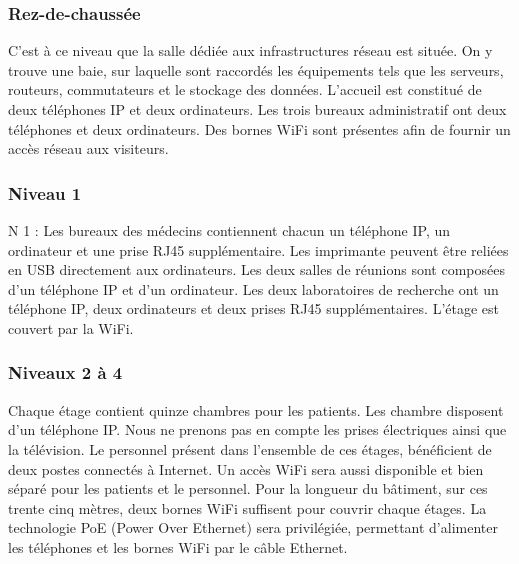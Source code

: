 \subsubsection{Rez-de-chaussée}
C'est à ce niveau que la salle dédiée aux infrastructures réseau est située.
On y trouve une baie, sur laquelle sont raccordés les équipements tels que les serveurs, routeurs, commutateurs et le stockage des données.
L'accueil est constitué de deux téléphones IP et deux ordinateurs.
Les trois bureaux administratif ont deux téléphones et deux ordinateurs.
Des bornes WiFi sont présentes afin de fournir un accès réseau aux visiteurs.

\subsubsection{Niveau 1}
N 1 : Les bureaux des médecins contiennent chacun un téléphone IP, un ordinateur et une prise RJ45 supplémentaire.
Les imprimante peuvent être reliées en USB directement aux ordinateurs.
Les deux salles de réunions sont composées d'un téléphone IP et d'un ordinateur.
Les deux laboratoires de recherche ont un téléphone IP, deux ordinateurs et deux prises RJ45 supplémentaires.
L'étage est couvert par la WiFi.

\subsubsection{Niveaux 2 à 4}
Chaque étage contient quinze chambres pour les patients.
Les chambre disposent d'un téléphone IP. Nous ne prenons pas en compte les prises électriques ainsi que la télévision.
Le personnel présent dans l'ensemble de ces étages, bénéficient de deux postes connectés à Internet.
Un accès WiFi sera aussi disponible et bien séparé pour les patients et le personnel.
Pour la longueur du bâtiment, sur ces trente cinq mètres, deux bornes WiFi suffisent pour couvrir chaque étages.
La technologie PoE (Power Over Ethernet) sera privilégiée, permettant d'alimenter les téléphones et les bornes WiFi par le câble Ethernet.

%
%
